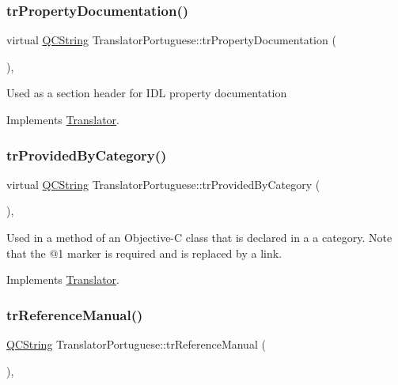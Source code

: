 \subsubsection{\texorpdfstring{trPropertyDocumentation()}{trPropertyDocumentation()}}
{\footnotesize\ttfamily virtual \mbox{\hyperlink{class_q_c_string}{Q\+C\+String}} Translator\+Portuguese\+::tr\+Property\+Documentation (\begin{DoxyParamCaption}{ }\end{DoxyParamCaption})\hspace{0.3cm}{\ttfamily [inline]}, {\ttfamily [virtual]}}

Used as a section header for I\+DL property documentation 

Implements \mbox{\hyperlink{class_translator}{Translator}}.

\mbox{\label{class_translator_portuguese_a21f69d47afa822f02c514cf8ebd79fdb}} 
\subsubsection{\texorpdfstring{trProvidedByCategory()}{trProvidedByCategory()}}
{\footnotesize\ttfamily virtual \mbox{\hyperlink{class_q_c_string}{Q\+C\+String}} Translator\+Portuguese\+::tr\+Provided\+By\+Category (\begin{DoxyParamCaption}{ }\end{DoxyParamCaption})\hspace{0.3cm}{\ttfamily [inline]}, {\ttfamily [virtual]}}

Used in a method of an Objective-\/C class that is declared in a a category. Note that the @1 marker is required and is replaced by a link. 

Implements \mbox{\hyperlink{class_translator}{Translator}}.

\mbox{\label{class_translator_portuguese_a9fe10e7b93905d937ce2cf6936712b80}} 
\subsubsection{\texorpdfstring{trReferenceManual()}{trReferenceManual()}}
{\footnotesize\ttfamily \mbox{\hyperlink{class_q_c_string}{Q\+C\+String}} Translator\+Portuguese\+::tr\+Reference\+Manual (\begin{DoxyParamCaption}{ }\end{DoxyParamCaption})\hspace{0.3cm}{\ttfamily [inline]}, {\ttfamily [virtual]}}

